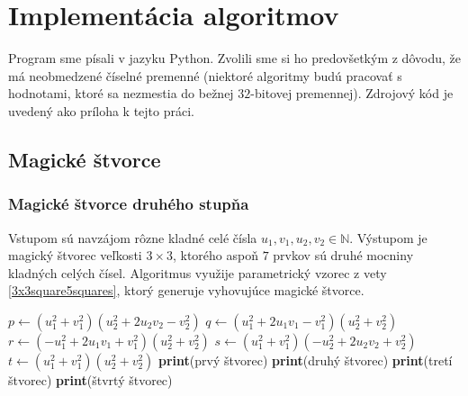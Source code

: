 \chapter{Implementácia algoritmov}

\label{kap:implementation} %

Program sme písali v jazyku Python. Zvolili sme si ho predovšetkým z dôvodu, že má neobmedzené číselné premenné (niektoré algoritmy budú pracovať s hodnotami, ktoré sa nezmestia do bežnej $32$-bitovej premennej). Zdrojový kód je uvedený ako príloha k tejto práci.

\section{Magické štvorce}

\subsection{Magické štvorce druhého stupňa}

\begin{alg} 
\label{algsquare3x3uvw}
Vstupom sú navzájom rôzne kladné celé čísla $u_1, v_1, u_2, v_2 \in \mathbb{N}$. Výstupom je magický štvorec veľkosti $3 \times 3$, ktorého aspoň $7$ prvkov sú druhé mocniny kladných celých čísel. Algoritmus využije parametrický vzorec z vety \ref{3x3square5squares}, ktorý generuje vyhovujúce magické štvorce.
\end{alg}

\begin{algorithmic}
\State $p \gets (u_1^2 + v_1^2)(u_2^2 + 2u_2 v_2 - v_2^2)$
\State $q \gets (u_1^2 + 2u_1 v_1 - v_1^2)(u_2^2 + v_2^2)$
\State $r \gets (- u_1^2 + 2u_1 v_1 + v_1^2)(u_2^2 + v_2^2)$
\State $s \gets (u_1^2 + v_1^2)(-u_2^2 + 2u_2 v_2 + v_2^2)$
\State $t \gets (u_1^2 + v_1^2)(u_2^2 + v_2^2)$
    \STATE \textbf{print}(prvý štvorec)
\ENDIF
{}
    \STATE \textbf{print}(druhý štvorec)
\ENDIF
{}
    \STATE \textbf{print}(tretí štvorec)
\ENDIF
{}
    \STATE \textbf{print}(štvrtý štvorec)
\ENDIF
\end{algorithmic}


